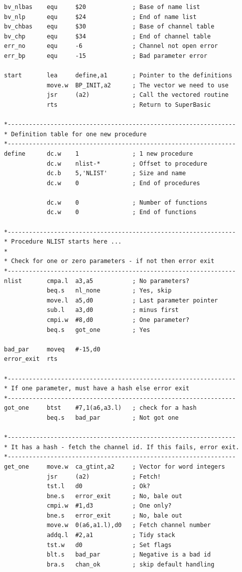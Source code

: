 \begin{lstlisting}[firstnumber=1,caption={Procedure to Print the Entire Name List},label={lst:NlistProcedure}]
bv_nlbas    equ     $20             ; Base of name list
bv_nlp      equ     $24             ; End of name list
bv_chbas    equ     $30             ; Base of channel table
bv_chp      equ     $34             ; End of channel table
err_no      equ     -6              ; Channel not open error
err_bp      equ     -15             ; Bad parameter error

start       lea     define,a1       ; Pointer to the definitions
            move.w  BP_INIT,a2      ; The vector we need to use
            jsr     (a2)            ; Call the vectored routine
            rts                     ; Return to SuperBasic

*----------------------------------------------------------------
* Definition table for one new procedure
*----------------------------------------------------------------
define      dc.w    1               ; 1 new procedure
            dc.w    nlist-*         ; Offset to procedure
            dc.b    5,'NLIST'       ; Size and name
            dc.w    0               ; End of procedures

            dc.w    0               ; Number of functions
            dc.w    0               ; End of functions

*----------------------------------------------------------------
* Procedure NLIST starts here ...
*
* Check for one or zero parameters - if not then error exit
*----------------------------------------------------------------
nlist       cmpa.l  a3,a5           ; No parameters?
            beq.s   nl_none         ; Yes, skip
            move.l  a5,d0           ; Last parameter pointer
            sub.l   a3,d0           ; minus first
            cmpi.w  #8,d0           ; One parameter?
            beq.s   got_one         ; Yes

bad_par     moveq   #-15,d0
error_exit  rts

*----------------------------------------------------------------
* If one parameter, must have a hash else error exit
*----------------------------------------------------------------
got_one     btst    #7,1(a6,a3.l)   ; check for a hash
            beq.s   bad_par         ; Not got one

*----------------------------------------------------------------
* It has a hash - fetch the channel id. If this fails, error exit.
*----------------------------------------------------------------
get_one     move.w  ca_gtint,a2     ; Vector for word integers
            jsr     (a2)            ; Fetch!
            tst.l   d0              ; Ok?
            bne.s   error_exit      ; No, bale out
            cmpi.w  #1,d3           ; One only?
            bne.s   error_exit      ; No, bale out
            move.w  0(a6,a1.l),d0   ; Fetch channel number
            addq.l  #2,a1           ; Tidy stack
            tst.w   d0              ; Set flags
            blt.s   bad_par         ; Negative is a bad id
            bra.s   chan_ok         ; skip default handling


\end{lstlisting}
